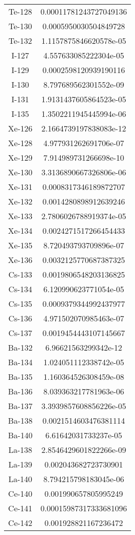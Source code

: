 \begin{table}[h!]
\begin{tabular}{|| c || c |}
Te-128 & 0.00011781243727049136 \\
Te-130 & 0.0005950030504849728 \\
Te-132 & 1.1157875846620578e-05 \\
I-127 & 4.557633085222304e-05 \\
I-129 & 0.0002598120939190116 \\
I-130 & 8.797689562301552e-09 \\
I-131 & 1.9131437605864523e-05 \\
I-135 & 1.3502211945445994e-06 \\
Xe-126 & 2.1664739197838083e-12 \\
Xe-128 & 4.977931262691706e-07 \\
Xe-129 & 7.914989731266698e-10 \\
Xe-130 & 3.3136890667326806e-06 \\
Xe-131 & 0.0008317346189872707 \\
Xe-132 & 0.0014280898912639246 \\
Xe-133 & 2.7806026788919374e-05 \\
Xe-134 & 0.0024271517266454433 \\
Xe-135 & 8.720493793709896e-07 \\
Xe-136 & 0.0032125770687387325 \\
Cs-133 & 0.0019806548203136825 \\
Cs-134 & 6.120990623771054e-05 \\
Cs-135 & 0.0009379344992437977 \\
Cs-136 & 4.971502070985463e-07 \\
Cs-137 & 0.0019454443107145667 \\
Ba-132 & 6.96621563299342e-12 \\
Ba-134 & 1.024051112338742e-05 \\
Ba-135 & 1.160364526308459e-08 \\
Ba-136 & 8.039363217781963e-06 \\
Ba-137 & 3.3939857608856226e-05 \\
Ba-138 & 0.0021514603476381114 \\
Ba-140 & 6.61642031733237e-05 \\
La-138 & 2.8546429601822266e-09 \\
La-139 & 0.002043682723730901 \\
La-140 & 8.794215798183045e-06 \\
Ce-140 & 0.001990657805995249 \\
Ce-141 & 0.00015987317333681096 \\
Ce-142 & 0.001928821167236472 \\

\end{tabular}
\end{table}

